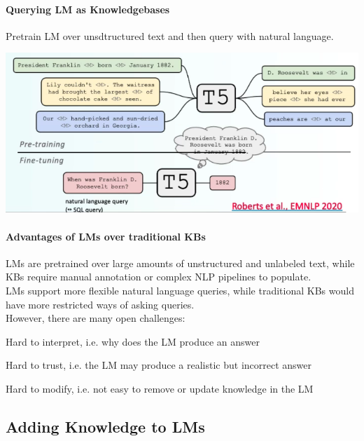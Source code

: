 \documentclass[10pt]{report}
\begin{document}
\paragraph{Querying LM as Knowledgebases} Pretrain LM over unsdtructured  text and then query with natural language.
\begin{center}
	\includegraphics[scale=0.5]{105.png}
\end{center}
\paragraph{Advantages of LMs over traditional KBs} LMs are pretrained over large amounts of unstructured and unlabeled text, while KBs require manual annotation or complex NLP pipelines to populate.\\
LMs support more flexible natural language queries, while traditional KBs would have more restricted ways of asking queries.\\
However, there are many open challenges:
\begin{list}{}{}
	\item Hard to interpret, i.e. why does the LM produce an answer
	\item Hard to trust, i.e. the LM may produce a realistic but incorrect answer
	\item Hard to modify, i.e. not easy to remove or update knowledge in the LM
\end{list}
\subsection{Adding Knowledge to LMs}
\end{document}
